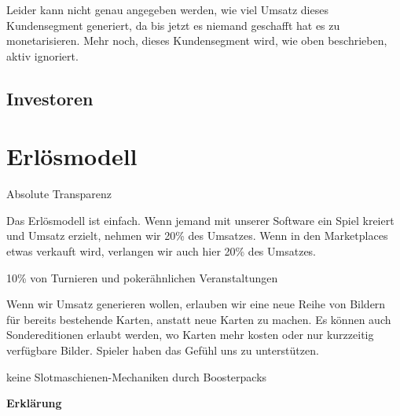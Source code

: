 \documentclass[fontsize=12, a4aper]{scrartcl}
\begin{document}
Leider kann nicht genau angegeben werden, wie viel Umsatz dieses Kundensegment generiert, da bis jetzt es niemand geschafft hat es zu monetarisieren. Mehr noch, dieses Kundensegment wird, wie oben beschrieben, aktiv ignoriert.


\subsection{Investoren} \label{subsec:Investoren}

\section{Erlösmodell} \label{sec:Erloesmodell}

Absolute Transparenz

Das Erlösmodell ist einfach. Wenn jemand mit unserer Software ein Spiel kreiert und Umsatz erzielt, nehmen wir 20\% des Umsatzes. Wenn in den Marketplaces etwas verkauft wird, verlangen wir auch hier 20\% des Umsatzes. 

10\% von Turnieren und pokerähnlichen Veranstaltungen

Wenn wir Umsatz generieren wollen, erlauben wir eine neue Reihe von Bildern für bereits bestehende Karten, anstatt neue Karten zu machen. Es können auch Sondereditionen erlaubt werden, wo Karten mehr kosten oder nur kurzzeitig verfügbare Bilder. Spieler haben das Gefühl uns zu unterstützen.

keine Slotmaschienen-Mechaniken durch Boosterpacks




\newpage

\listoftables

\listoffigures

\newpage

\appendix




\newpage

\begin{center}
	
	\fontsize{14pt}{12pt}
	
	\textbf{Erklärung}\\
	
\end{center}
\end{document}
